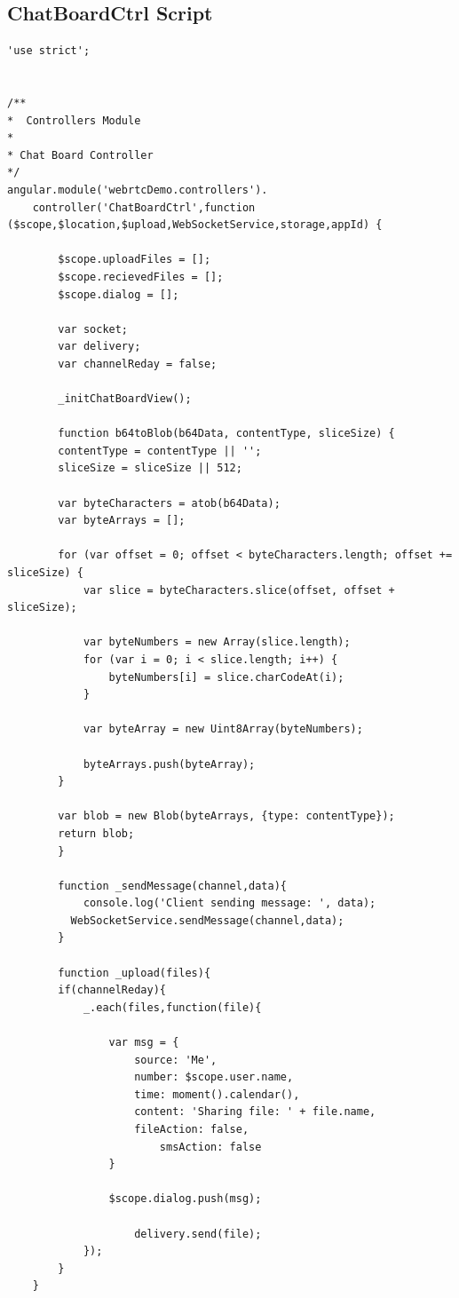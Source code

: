 \begin{appendices}
\section{ChatBoardCtrl Script}
\label{app:chatboard_ctrl}

\begin{lstlisting}[caption={Files Sharing in ChatBoardCtrl.js},label={code:client_fileshare}]
'use strict';


/**
*  Controllers Module
*
* Chat Board Controller
*/
angular.module('webrtcDemo.controllers').
	controller('ChatBoardCtrl',function ($scope,$location,$upload,WebSocketService,storage,appId) {

		$scope.uploadFiles = [];
		$scope.recievedFiles = [];
		$scope.dialog = [];

		var socket;
		var delivery;
		var channelReday = false;

		_initChatBoardView();

		function b64toBlob(b64Data, contentType, sliceSize) {
	    contentType = contentType || '';
	    sliceSize = sliceSize || 512;

	    var byteCharacters = atob(b64Data);
	    var byteArrays = [];

	    for (var offset = 0; offset < byteCharacters.length; offset += sliceSize) {
	        var slice = byteCharacters.slice(offset, offset + sliceSize);

	        var byteNumbers = new Array(slice.length);
	        for (var i = 0; i < slice.length; i++) {
	            byteNumbers[i] = slice.charCodeAt(i);
	        }

	        var byteArray = new Uint8Array(byteNumbers);

	        byteArrays.push(byteArray);
	    }

	    var blob = new Blob(byteArrays, {type: contentType});
	    return blob;
		}

		function _sendMessage(channel,data){
			console.log('Client sending message: ', data);
		  WebSocketService.sendMessage(channel,data);
		}

		function _upload(files){
  		if(channelReday){
  			_.each(files,function(file){

  				var msg = {
  					source: 'Me',
  					number: $scope.user.name,
  					time: moment().calendar(),
  					content: 'Sharing file: ' + file.name,
  					fileAction: false,
						smsAction: false
  				}

  				$scope.dialog.push(msg);

					delivery.send(file);
  			});
  		}
  	}


\end{lstlisting}
\end{appendices}
